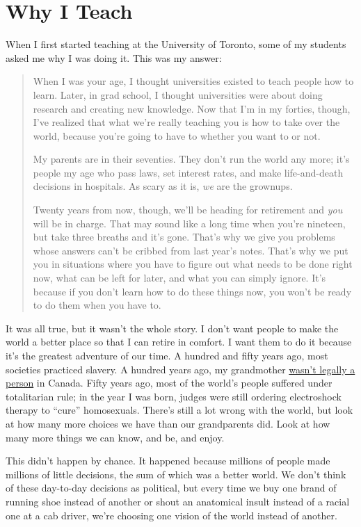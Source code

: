 \chapter{Why I Teach}\label{s:finale}

When I first started teaching at the University of Toronto, some of my
students asked me why I was doing it. This was my answer:

\begin{quote}\setlength{\parindent}{0pt}
When I was your age, I thought universities existed to teach people
how to learn. Later, in grad school, I thought universities were about
doing research and creating new knowledge. Now that I'm in my forties,
though, I've realized that what we're really teaching you is how to
take over the world, because you're going to have to whether you want
to or not.

My parents are in their seventies. They don't run the world any more;
it's people my age who pass laws, set interest rates, and make
life-and-death decisions in hospitals. As scary as it is, \emph{we} are the
grownups.

Twenty years from now, though, we'll be heading for retirement and
\emph{you} will be in charge. That may sound like a long time when you're
nineteen, but take three breaths and it's gone. That's why we give you
problems whose answers can't be cribbed from last year's notes. That's
why we put you in situations where you have to figure out what needs
to be done right now, what can be left for later, and what you can
simply ignore. It's because if you don't learn how to do these things
now, you won't be ready to do them when you have to.
\end{quote}

It was all true, but it wasn't the whole story. I don't want people to
make the world a better place so that I can retire in comfort. I want
them to do it because it's the greatest adventure of our time. A
hundred and fifty years ago, most societies practiced slavery. A
hundred years ago, my grandmother \href{https://en.wikipedia.org/wiki/The\_Famous\_Five\_(Canada)}{wasn't legally a
person} in Canada. Fifty years ago, most of the world's
people suffered under totalitarian rule; in the year I was born,
judges were still ordering electroshock therapy to ``cure''
homosexuals. There's still a lot wrong with the world, but look at how
many more choices we have than our grandparents did. Look at how many
more things we can know, and be, and enjoy.

This didn't happen by chance. It happened because millions of people
made millions of little decisions, the sum of which was a better world.
We don't think of these day-to-day decisions as political, but every
time we buy one brand of running shoe instead of another or shout an
anatomical insult instead of a racial one at a cab driver, we're
choosing one vision of the world instead of another.

